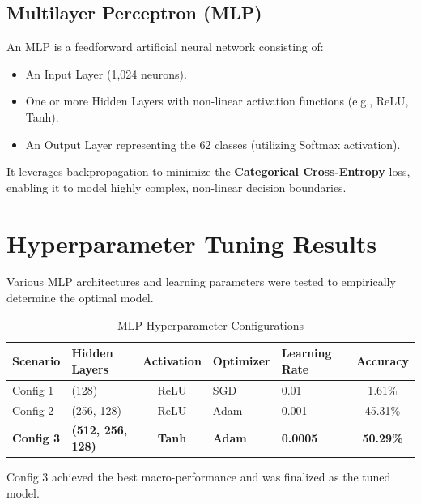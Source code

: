 \documentclass[12pt]{article}
\begin{document}
\subsection{Multilayer Perceptron (MLP)}

An MLP is a feedforward artificial neural network consisting of:
\begin{itemize}
    \item An Input Layer (1,024 neurons).
    \item One or more Hidden Layers with non-linear activation functions (e.g., ReLU, Tanh).
    \item An Output Layer representing the 62 classes (utilizing Softmax activation).
\end{itemize}

It leverages backpropagation to minimize the \textbf{Categorical Cross-Entropy} loss, enabling it to model highly complex, non-linear decision boundaries.


\section{Hyperparameter Tuning Results}

Various MLP architectures and learning parameters were tested to empirically determine the optimal model.

\begin{table}[H]
\centering
\caption{MLP Hyperparameter Configurations}
\label{tab:hyperparams}
\begin{tabular}{llcllc}
\toprule
\textbf{Scenario} & \textbf{Hidden Layers} & \textbf{Activation} & \textbf{Optimizer} & \textbf{Learning Rate} & \textbf{Accuracy} \\
\midrule
Config 1 & (128) & ReLU & SGD & 0.01 & 1.61\% \\
Config 2 & (256, 128) & ReLU & Adam & 0.001 & 45.31\% \\
\textbf{Config 3} & \textbf{(512, 256, 128)} & \textbf{Tanh} & \textbf{Adam} & \textbf{0.0005} & \textbf{50.29\%} \\
\bottomrule
\end{tabular}
\end{table}

Config 3 achieved the best macro-performance and was finalized as the tuned model.

\end{document}
